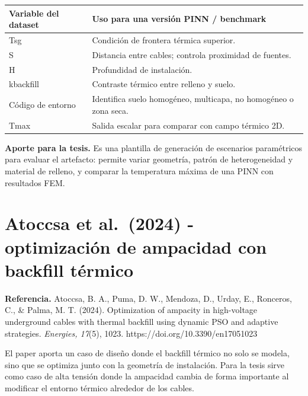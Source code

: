 \documentclass[11pt,a4paper,oneside]{report}
\begin{document}
\begin{longtable}[]{@{}
  >{\raggedright\arraybackslash}p{}
  >{\raggedright\arraybackslash}p{}@{}}
\toprule\noalign{}
\begin{minipage}[b]{\linewidth}\raggedright
Variable del dataset
\end{minipage} & \begin{minipage}[b]{\linewidth}\raggedright
Uso para una versión PINN / benchmark
\end{minipage} \\
\midrule\noalign{}
\endhead
\bottomrule\noalign{}
\endlastfoot
Tsg & Condición de frontera térmica superior. \\
S & Distancia entre cables; controla proximidad de fuentes. \\
H & Profundidad de instalación. \\
kbackfill & Contraste térmico entre relleno y suelo. \\
Código de entorno & Identifica suelo homogéneo, multicapa, no homogéneo
o zona seca. \\
Tmax & Salida escalar para comparar con campo térmico 2D. \\
\end{longtable}

\textbf{Aporte para la tesis.} Es una plantilla de generación de
escenarios paramétricos para evaluar el artefacto: permite variar
geometría, patrón de heterogeneidad y material de relleno, y comparar la
temperatura máxima de una PINN con resultados FEM.

\section{Atoccsa et al.~(2024) - optimización de ampacidad con backfill
térmico}\label{atoccsa-et-al.-2024---optimizaciuxf3n-de-ampacidad-con-backfill-tuxe9rmico}

\textbf{Referencia.} Atoccsa, B. A., Puma, D. W., Mendoza, D., Urday,
E., Ronceros, C., \& Palma, M. T. (2024). Optimization of ampacity in
high-voltage underground cables with thermal backfill using dynamic PSO
and adaptive strategies. \emph{Energies, 17}(5), 1023.
https://doi.org/10.3390/en17051023

El paper aporta un caso de diseño donde el backfill térmico no solo se
modela, sino que se optimiza junto con la geometría de instalación. Para
la tesis sirve como caso de alta tensión donde la ampacidad cambia de
forma importante al modificar el entorno térmico alrededor de los
cables.
\end{document}

